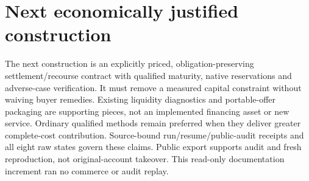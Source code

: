 \documentclass[10pt,letterpaper]{article}
\begin{document}
\section*{Next economically justified construction}
The next construction is an explicitly priced, obligation-preserving settlement/recourse contract with qualified maturity, native reservations and adverse-case verification. It must remove a measured capital constraint without waiving buyer remedies. Existing liquidity diagnostics and portable-offer packaging are supporting pieces, not an implemented financing asset or new service. Ordinary qualified methods remain preferred when they deliver greater complete-cost contribution.
\footnotesize Source-bound run/resume/public-audit receipts and all eight raw states govern these claims. Public export supports audit and fresh reproduction, not original-account takeover. This read-only documentation increment ran no commerce or audit replay.\normalsize
\end{document}
